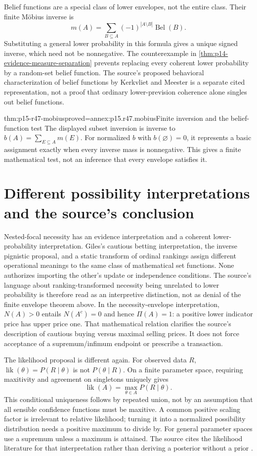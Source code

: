 Belief functions are a special class of lower envelopes, not the entire
class. Their finite M\"obius inverse is
\[
 m(A)=\sum_{B\subseteq A}(-1)^{|A\setminus B|}\operatorname{Bel}(B).
\]
Substituting a general lower probability in this formula gives a unique
signed inverse, which need not be nonnegative. The counterexample in
\cref{thm:p14-evidence-measure-separation} prevents replacing every coherent
lower probability by a random-set belief function. The source's proposed
behavioral characterization of belief functions by Kerkvliet and Meester
is a separate cited representation, not a proof that ordinary lower-prevision
coherence alone singles out belief functions.

\begin{hblemma}{thm:p15-r47-mobius}{proved=annex:p15.r47.mobius}{Finite inversion and the belief-function test}
The displayed subset inversion is inverse to
\(b(A)=\sum_{E\subseteq A}m(E)\). For normalized \(b\) with
\(b(\varnothing)=0\), it represents a basic assignment exactly when every
inverse mass is nonnegative. This gives a finite mathematical test, not
an inference that every envelope satisfies it.
\end{hblemma}

\section{Different possibility interpretations and the source's conclusion}

Nested-focal necessity has an evidence interpretation and a coherent lower-
probability interpretation. Giles's cautious betting interpretation, the
inverse pignistic proposal, and a static transform of ordinal rankings assign
different operational meanings to the same class of mathematical set
functions. None authorizes importing the other's update or independence
conditions. The source's language about ranking-transformed necessity being
unrelated to lower probability is therefore read as an interpretive
distinction, not as denial of the finite envelope theorem above.
In the necessity-envelope interpretation, \(N(A)>0\) entails
\(N(A^c)=0\) and hence \(\Pi(A)=1\): a positive lower indicator price
has upper price one. That mathematical relation clarifies the source's
description of cautious buying versus maximal selling prices. It does not
force acceptance of a supremum/infimum endpoint or prescribe a transaction.

The likelihood proposal is different again. For observed data \(R\),
\(\operatorname{lik}(\theta)=P(R\mid\theta)\) is not
\(P(\theta\mid R)\). On a finite parameter space, requiring maxitivity
and agreement on singletons uniquely gives
\[
 \operatorname{lik}(A)=\max_{\theta\in A}P(R\mid\theta).
\]
This conditional uniqueness follows by repeated union, not by an assumption
that all sensible confidence functions must be maxitive. A common positive
scaling factor is irrelevant to relative likelihood; turning it into a
normalized possibility distribution needs a positive maximum to divide by.
For general parameter spaces use a supremum unless a maximum is attained.
The source cites the likelihood literature for that interpretation rather
than deriving a posterior without a prior
\cite[\S4.4]{DuboisPrade2021RepresentingBelief}.

